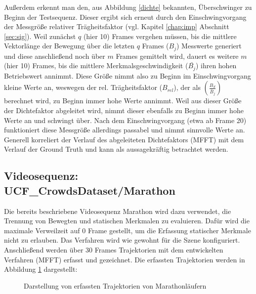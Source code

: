Außerdem erkennt man den, aus Abbildung \ref{dichte} bekannten, Überschwinger zu Beginn der Testsequenz. Dieser ergibt sich erneut durch den Einschwingvorgang der Messgröße relativer Trägheitsfaktor (vgl. Kapitel \ref{chap:imp} Abschnitt \ref{sec:sig}). Weil zunächst $q$ (hier 10) Frames vergehen müssen, bis die mittlere Vektorlänge der Bewegung über die letzten $q$ Frames ($B_j$) Messwerte generiert und diese anschließend noch über $m$ Frames gemittelt wird, dauert es weitere $m$ (hier 10) Frames, bis die mittlere Merkmalsgeschwindigkeit ($\bar{B_j}$) ihren hohen Betriebswert annimmt. Diese Größe nimmt also zu Beginn im Einschwingvorgang kleine Werte an, weswegen der rel. Trägheitsfaktor ($B_{rel}$), der als $(\frac{B_S}{\bar{B}_j})$ berechnet wird, zu Beginn immer hohe Werte annimmt. Weil aus dieser Größe der Dichtefaktor abgeleitet wird, nimmt dieser ebenfalls zu Beginn immer hohe Werte an und schwingt über. Nach dem Einschwingvorgang (etwa ab Frame 20) funktioniert diese Messgröße allerdings passabel und nimmt sinnvolle Werte an. Generell korreliert der Verlauf des abgeleiteten Dichtefaktors (MFFT) mit dem Verlauf der Ground Truth und kann als aussagekräftig betrachtet werden.
\newpage
\subsection{Videosequenz: UCF\_CrowdsDataset/Marathon \cite{AliS07}}
Die bereits beschriebene Videosequenz Marathon wird dazu verwendet, die Trennung von Bewegten und statischen Merkmalen zu evaluieren. Dafür wird die maximale Verweilzeit auf 0 Frame gestellt, um die Erfassung statischer Merkmale nicht zu erlauben. Das Verfahren wird wie gewohnt für die Szene konfiguriert. Anschließend werden über 30 Frames Trajektorien mit dem entwickelten Verfahren (MFFT) erfasst und gezeichnet. Die erfassten Trajektorien werden in Abbildung \ref{run_trajectories} dargestellt:
\vskip 10pt
\begin{figure}[h]
  \centering
  \caption{Darstellung von erfassten Trajektorien von Marathonläufern \cite{AliS07}}
  \label{run_trajectories}
\end{figure}

